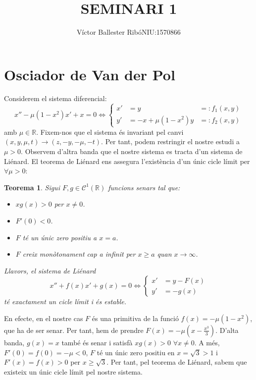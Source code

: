 \documentclass[a4paper]{article}
\title{\bfseries\large SEMINARI 1}
\author{Víctor Ballester Ribó\endgraf NIU:1570866}
\date{\parbox{\linewidth}{\centering
  Sistemes dinàmics\endgraf
  Grau en Matemàtiques\endgraf
  Universitat Autònoma de Barcelona\endgraf
  Desembre de 2022}}
\newcommand{\RR}{\ensuremath{\mathbb{R}}} %
\newtheorem{theorem}{Teorema}
\theoremstyle{definition}
\begin{document}
\maketitle
\section{\texorpdfstring{Osci\lgem ador}{Oscil.lador} de Van der Pol}
Considerem el sistema diferencial:
\begin{equation}\label{sis1}
  x''-\mu(1-x^2)x'+x=0\iff\left\{
  \begin{aligned}
    x' & =y                & =:  f_1(x,y) \\
    y' & =-x + \mu(1-x^2)y & =: f_2(x,y)
  \end{aligned}
  \right.
\end{equation}
amb $\mu\in\RR$. Fixem-nos que el sistema és invariant pel canvi $(x,y,\mu, t)\to(z,-y,-\mu,-t)$. Per tant, podem restringir el nostre estudi a $\mu>0$. Observem d'altra banda que el nostre sistema es tracta d'un sistema de Liénard. El teorema de Liénard ens assegura l'existència d'un únic cicle límit per $\forall\mu>0$:
\begin{theorem}
  Sigui $F,g\in \mathcal{C}^1(\RR)$ funcions senars tal que:
  \begin{itemize}
    \item $xg(x)>0$ per $x\ne 0$.
    \item $F'(0)<0$.
    \item $F$ té un únic zero positiu a $x=a$.
    \item $F$ creix monòtonament cap a infinit per $x\geq a$ quan $x\to\infty$.
  \end{itemize}
  Llavors, el sistema de Liénard
  \begin{equation}
    x''+f(x)x'+g(x)=0\iff\left\{
    \begin{aligned}
      x' & =y-F(x) \\
      y' & =-g(x)
    \end{aligned}
    \right.
  \end{equation}
  té exactament un cicle límit i és estable.
\end{theorem}
En efecte, en el nostre cas $F$ és una primitiva de la funció $f(x) =-\mu (1-x^2)$, que ha de ser senar. Per tant, hem de prendre $F(x)=-\mu(x-\frac{x^3}{3})$. D'alta banda, $g(x) = x$ també és senar i satisfà $xg(x)>0$ $\forall x\ne 0$. A més, $F'(0)=f(0)=-\mu <0$, $F$ té un únic zero positiu en $x=\sqrt{3}>1$ i $F'(x)=f(x)>0$ per $x\geq \sqrt{3}$. Per tant, pel teorema de Liénard, sabem que existeix un únic cicle límit pel nostre sistema.
\end{document}
